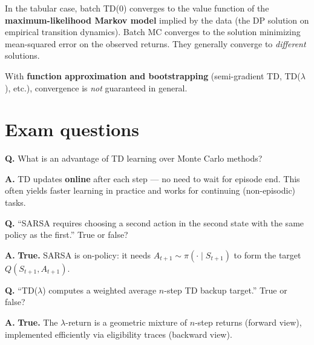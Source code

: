 \documentclass[11pt, oneside]{book}
\begin{document}
\begin{notebox}[title={Batch TD vs.\ Batch MC}]
In the tabular case, batch TD(0) converges to the value function of the
\textbf{maximum-likelihood Markov model} implied by the data (the DP solution
on empirical transition dynamics). Batch MC converges to the solution
minimizing mean-squared error on the observed returns. They generally converge
to \emph{different} solutions.

With \textbf{function approximation and bootstrapping} (semi-gradient TD,
TD($\lambda$), etc.), convergence is \emph{not} guaranteed in general.
\end{notebox}

\section{Exam questions}

\begin{exbox}[title={Exam: TD vs.\ MC}]
\textbf{Q.} What is an advantage of TD learning over Monte Carlo methods?

\medskip
\textbf{A.} TD updates \textbf{online} after each step --- no need to wait for
episode end. This often yields faster learning in practice and works for
continuing (non-episodic) tasks.
\end{exbox}

\begin{exbox}[title={Exam: SARSA On-Policy}]
\textbf{Q.} ``SARSA requires choosing a second action in the second state with
the same policy as the first.'' True or false?

\medskip
\textbf{A.} \textbf{True.} SARSA is on-policy: it needs
$A_{t+1} \sim \pi(\cdot\mid S_{t+1})$ to form the target $Q(S_{t+1},A_{t+1})$.
\end{exbox}

\begin{exbox}[title={Exam: TD($\lambda$)}]
\textbf{Q.} ``TD($\lambda$) computes a weighted average $n$-step TD backup
target.'' True or false?

\medskip
\textbf{A.} \textbf{True.} The $\lambda$-return is a geometric mixture of
$n$-step returns (forward view), implemented efficiently via eligibility
traces (backward view).
\end{exbox}
\end{document}
